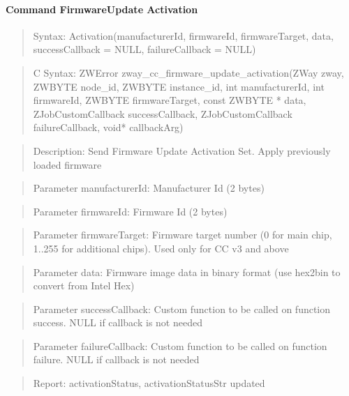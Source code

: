 \paragraph{Command FirmwareUpdate Activation}
\begin{quote}Syntax: Activation(manufacturerId, firmwareId, firmwareTarget, data, successCallback = NULL, failureCallback = NULL)\end{quote}
\begin{quote}C Syntax: ZWError zway\_cc\_firmware\_update\_activation(ZWay zway, ZWBYTE node\_id, ZWBYTE instance\_id, int manufacturerId, int firmwareId, ZWBYTE firmwareTarget, const ZWBYTE * data, ZJobCustomCallback successCallback, ZJobCustomCallback failureCallback, void* callbackArg)\end{quote}
\begin{quote}Description: Send Firmware Update Activation Set. Apply previously loaded firmware\end{quote}
\begin{quote}Parameter manufacturerId: Manufacturer Id (2 bytes)\end{quote}
\begin{quote}Parameter firmwareId: Firmware Id (2 bytes)\end{quote}
\begin{quote}Parameter firmwareTarget: Firmware target number (0 for main chip, 1..255 for additional chips). Used only for CC v3 and above\end{quote}
\begin{quote}Parameter data: Firmware image data in binary format (use hex2bin to convert from Intel Hex)\end{quote}
\begin{quote}Parameter successCallback: Custom function to be called on function success. NULL if callback is not needed\end{quote}
\begin{quote}Parameter failureCallback: Custom function to be called on function failure. NULL if callback is not needed\end{quote}
\begin{quote}Report: activationStatus, activationStatusStr updated\end{quote}


